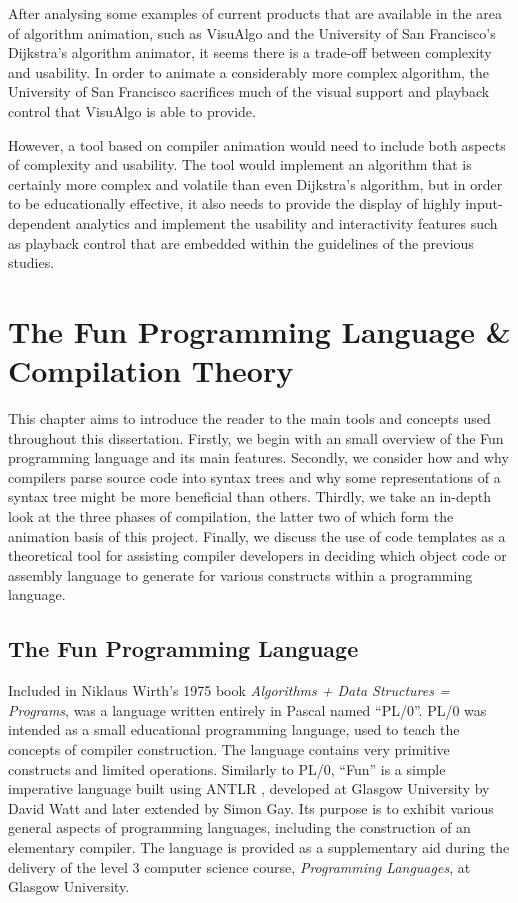 \documentclass{l4proj}
\begin{document}
After analysing some examples of current products that are available in the area of algorithm animation, such as VisuAlgo and the University of San Francisco's Dijkstra's algorithm animator, it seems there is a trade-off between complexity and usability. In order to animate a considerably more complex algorithm, the University of San Francisco sacrifices much of the visual support and playback control that VisuAlgo is able to provide. 

However, a tool based on compiler animation would need to include both aspects of complexity and usability. The tool would implement an algorithm that is certainly more complex and volatile than even Dijkstra's algorithm, but in order to be educationally effective, it also needs to provide the display of highly input-dependent analytics and implement the usability and interactivity features such as playback control that are embedded within the guidelines of the previous studies.

\chapter{The Fun Programming Language \& Compilation Theory}
This chapter aims to introduce the reader to the main tools and concepts used throughout this dissertation. Firstly, we begin with an small overview of the Fun programming language and its main features. Secondly, we consider how and why compilers parse source code into syntax trees and why some representations of a syntax tree might be more beneficial than others. Thirdly, we take an in-depth look at the three phases of compilation, the latter two of which form the animation basis of this project. Finally, we discuss the use of code templates as a theoretical tool for assisting compiler developers in deciding which object code or assembly language to generate for various constructs within a programming language.

\section{The Fun Programming Language}
Included in Niklaus Wirth's 1975 book {\it Algorithms + Data Structures = Programs}, was a language written entirely in Pascal named ``PL/0''. PL/0 was intended as a small educational programming language, used to teach the concepts of compiler construction. The language contains very primitive constructs and limited operations. Similarly to PL/0, ``Fun'' is a simple imperative language built using ANTLR \cite{antlr}, developed at Glasgow University by David Watt and later extended by Simon Gay. Its purpose is to exhibit various general aspects of programming languages, including the construction of an elementary compiler. The language is provided as a supplementary aid during the delivery of the level 3 computer science course, {\it Programming Languages}, at Glasgow University.
\end{document}
